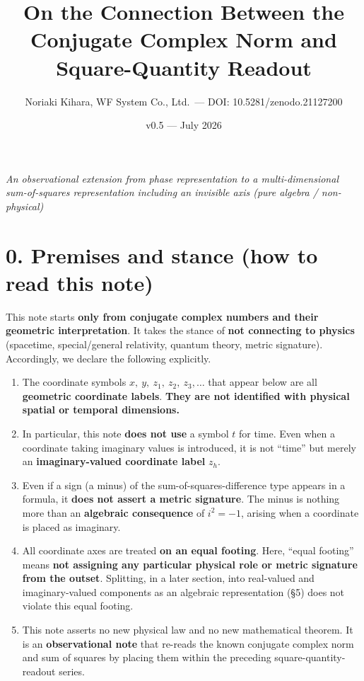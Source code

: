 \documentclass[11pt,a4paper]{article}
\title{On the Connection Between the Conjugate Complex Norm and
Square-Quantity Readout}
\author{Noriaki Kihara, WF System Co., Ltd.~--- DOI:
10.5281/zenodo.21127200}
\date{v0.5 --- July 2026}
\providecommand{\tightlist}{\setlength{\itemsep}{0pt}\setlength{\parskip}{0pt}}
\begin{document}
\maketitle
\emph{An observational extension from phase representation to a
multi-dimensional sum-of-squares representation including an invisible
axis (pure algebra / non-physical)}

\section{0. Premises and stance (how to read this
note)}\label{premises-and-stance-how-to-read-this-note}

This note starts \textbf{only from conjugate complex numbers and their
geometric interpretation}. It takes the stance of \textbf{not connecting
to physics} (spacetime, special/general relativity, quantum theory,
metric signature). Accordingly, we declare the following explicitly.

\begin{enumerate}
\def\labelenumi{\arabic{enumi}.}
\tightlist
\item
  The coordinate symbols \(x,\ y,\ z_1,\ z_2,\ z_3,\dots\) that appear
  below are all \textbf{geometric coordinate labels}. \textbf{They are
  not identified with physical spatial or temporal dimensions.}
\item
  In particular, this note \textbf{does not use} a symbol \(t\) for
  time. Even when a coordinate taking imaginary values is introduced, it
  is not ``time'' but merely an \textbf{imaginary-valued coordinate
  label} \(z_h\).
\item
  Even if a sign (a minus) of the sum-of-squares-difference type appears
  in a formula, it \textbf{does not assert a metric signature}. The
  minus is nothing more than an \textbf{algebraic consequence} of
  \(i^2=-1\), arising when a coordinate is placed as imaginary.
\item
  All coordinate axes are treated \textbf{on an equal footing}. Here,
  ``equal footing'' means \textbf{not assigning any particular physical
  role or metric signature from the outset}. Splitting, in a later
  section, into real-valued and imaginary-valued components as an
  algebraic representation (§5) does not violate this equal footing.
\item
  This note asserts no new physical law and no new mathematical theorem.
  It is an \textbf{observational note} that re-reads the known conjugate
  complex norm and sum of squares by placing them within the preceding
  square-quantity-readout series.
\end{enumerate}
\end{document}
